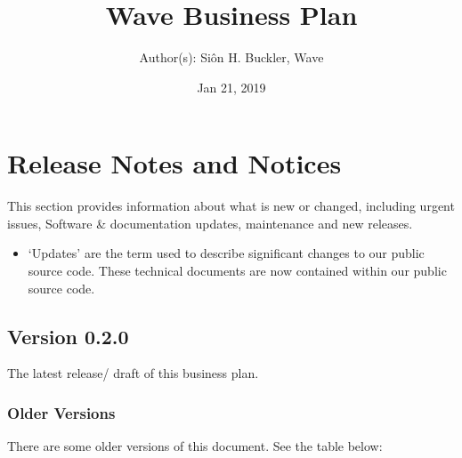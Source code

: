 \documentclass[letterpaper,10pt,openany,oneside,english]{sphinxmanual}
\title{Wave Business Plan}
\date{Jan 21, 2019}
\author{Author(s): Siôn H. Buckler, Wave}
\begin{document}
\maketitle
\sphinxtableofcontents
{}\label{\detokenize{index::doc}}


\noindent{}


\chapter{Release Notes and Notices}
\label{\detokenize{releasenotes:release-notes-and-notices}}\label{\detokenize{releasenotes::doc}}
This section provides information about what is new or changed, including urgent issues, Software \& documentation updates, maintenance and new releases.
\begin{itemize}
\item {} 
‘Updates’ are the term used to describe significant changes to our public source code. These technical documents are now contained within our public source code.

\end{itemize}


\section{Version 0.2.0}
\label{\detokenize{releasenotes:version-0-2-0}}
The latest release/ draft of this business plan.


\subsection{Older Versions}
\label{\detokenize{releasenotes:older-versions}}
There are some older versions of this document. See the table below:
\end{document}
